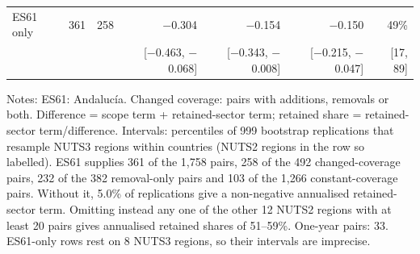 \begin{table}[width=\linewidth,pos=htbp]
\begin{tabular*}{\tblwidth}{@{}LRRRRRR@{}}
ES61 only & 361 & 258 & $-$0.304 & $-$0.154 & $-$0.150 & 49\% \\
 & & & [$-$0.463, $-$0.068] & [$-$0.343, $-$0.008] & [$-$0.215, $-$0.047] & [17, 89] \\
\bottomrule
\end{tabular*}
\par\smallskip\begin{minipage}{\linewidth}\footnotesize Notes: ES61: Andaluc\'ia. Changed coverage: pairs with additions, removals or both. Difference = scope term + retained-sector term; retained share = retained-sector term/difference. Intervals: percentiles of 999 bootstrap replications that resample NUTS3 regions within countries (NUTS2 regions in the row so labelled). ES61 supplies 361 of the 1,758 pairs, 258 of the 492 changed-coverage pairs, 232 of the 382 removal-only pairs and 103 of the 1,266 constant-coverage pairs. Without it, 5.0\% of replications give a non-negative annualised retained-sector term. Omitting instead any one of the other 12 NUTS2 regions with at least 20 pairs gives annualised retained shares of 51--59\%. One-year pairs: 33. ES61-only rows rest on 8 NUTS3 regions, so their intervals are imprecise.\end{minipage}
\end{table}

